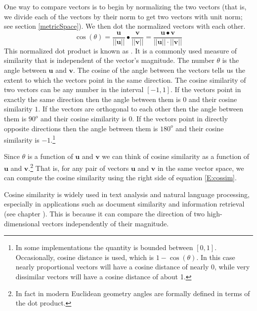    One way to compare vectors is to begin by normalizing the two vectors (that is, we divide each
of the vectors by their norm to get two vectors with unit norm; see 
section \ref{metricSpace}). We then dot the normalized vectors with each 
other.
\begin{equation}\label{E:cossim}
\cos(\theta) = 
\frac{\mathbf{u}}{|| \mathbf{u}||}  \bullet 
\frac{\mathbf{v}}{|| \mathbf{v}||} =
\frac{\mathbf{u} \bullet \mathbf{v}}{|| \mathbf{u}||  \cdot 
||\mathbf{v}||}
\end{equation}
This normalized dot product is known as . It is a 
commonly used measure of similarity that is independent of the vector's 
magnitude. The number $\theta$ is the angle between $\mathbf{u}$ and 
$\mathbf{v}$. The cosine of the angle between the vectors tells us the extent 
to which the vectors point in the same direction. The cosine similarity of two 
vectors can be any number in the interval $[-1, 1]$. If the vectors point in 
exactly the same direction then the angle between them is $0$ and their cosine 
similarity $1$. If the vectors are orthogonal to each other then the angle 
between them is $90^o$ and their cosine similarity is $0$. If the vectors 
point in directly opposite directions then the angle between them is $180^o$ 
and their cosine similarity is $-1$.\footnote{In some implementations the
quantity is bounded between $[0,1]$. Occasionally, cosine distance is used, 
which is $1 - \cos(\theta)$. In this case nearly proportional vectors 
will have a cosine distance of nearly 0, while very dissimilar vectors will 
have a cosine distance of about 1.}

Since $\theta$ is a function of  $\mathbf{u}$ and  $\mathbf{v}$ 
we can think of cosine similarity as a function of  $\mathbf{u}$ and  $\mathbf{v}$.\footnote{In fact in modern Euclidean geometry 
angles are formally defined in terms of the dot product.}  
That is, for any pair of vectors $\mathbf{u}$ and  $\mathbf{v}$ in the same vector space, we can compute the cosine similarity 
using the right side of equation \eqref{E:cossim}.

   Cosine similarity is widely used in text analysis and natural language 
processing, especially in applications such as document similarity and 
information retrieval (see chapter ). This is 
because it can compare the direction of two high-dimensional vectors independently
of their magnitude. 

